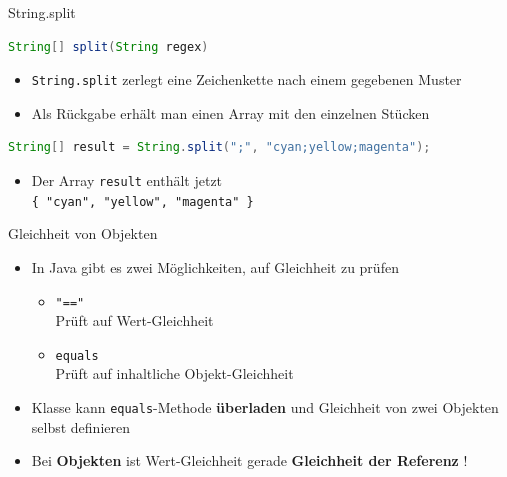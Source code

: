 \documentclass[18pt]{beamer}
\begin{document}
\appendix
\beginbackup

\begin{frame}[fragile]{String.split}
    \begin{lstlisting}[language=Java]
String[] split(String regex)
    \end{lstlisting}


    \begin{itemize}
        \item \texttt{String.split} zerlegt eine Zeichenkette nach einem gegebenen Muster
        \item Als Rückgabe erhält man einen Array mit den einzelnen Stücken
    \end{itemize}

\begin{exampleblock}{}
    \begin{lstlisting}[language=Java,basicstyle=\scriptsize]
String[] result = String.split(";", "cyan;yellow;magenta");
    \end{lstlisting}
\end{exampleblock}

\begin{itemize}
    \item Der Array \texttt{result} enthält jetzt\\ \texttt{\{ "cyan", "yellow", "magenta" \}}
\end{itemize}

\end{frame}

\begin{frame}{Gleichheit von Objekten}
    \begin{itemize}
        \item In Java gibt es zwei Möglichkeiten, auf Gleichheit zu prüfen
        \begin{itemize}
            \item \texttt{"=="}\\
            Prüft auf Wert-Gleichheit

            \item \texttt{equals}\\
            Prüft auf inhaltliche Objekt-Gleichheit
        \end{itemize}
        \item Klasse kann \texttt{equals}-Methode \textbf{überladen} und Gleichheit von zwei Objekten selbst definieren
        \item \alert{Bei \textbf{Objekten} ist Wert-Gleichheit gerade \textbf{Gleichheit der Referenz} !}
    \end{itemize}
\end{frame}
\end{document}
